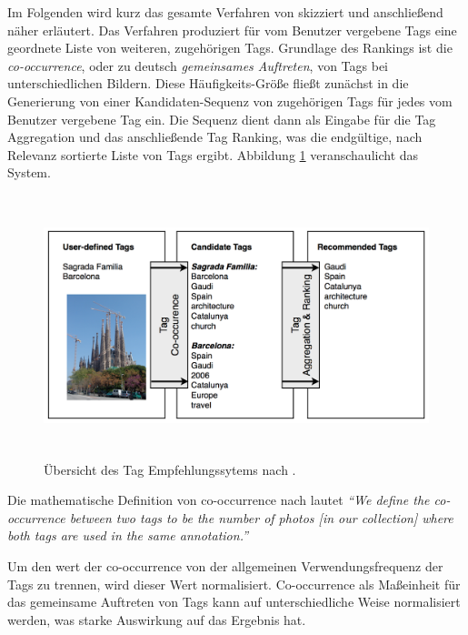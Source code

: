 Im Folgenden wird kurz das gesamte Verfahren von \cite{collectiveKnowledge} skizziert und anschließend näher erläutert. Das Verfahren produziert für vom Benutzer vergebene Tags eine geordnete Liste von weiteren, zugehörigen Tags. Grundlage des Rankings ist die \emph{co-occurrence}, oder zu deutsch \emph{gemeinsames Auftreten}, von Tags bei unterschiedlichen Bildern. Diese Häufigkeits-Größe fließt zunächst in die Generierung von einer Kandidaten-Sequenz von zugehörigen Tags für jedes vom Benutzer vergebene Tag ein. Die Sequenz dient dann als Eingabe für die Tag Aggregation und das anschließende Tag Ranking, was die endgültige, nach Relevanz sortierte Liste von Tags ergibt. Abbildung \ref{fig:images_collective_knowledge_system_overview} veranschaulicht das System.

\begin{figure}[htbp]
  \centering
    \includegraphics[height=3in]{images/collective_knowledge_system_overview.png}
  \caption{Übersicht des Tag Empfehlungssytems nach \cite{collectiveKnowledge}.}
  \label{fig:images_collective_knowledge_system_overview}
\end{figure}





Die mathematische Definition von co-occurrence nach \cite{collectiveKnowledge} lautet \emph{``We define the co-occurrence between two tags to be the number of photos [in our collection] where both tags are used in the same annotation.''}
 
 
Um den wert der co-occurrence von der allgemeinen Verwendungsfrequenz der Tags zu trennen, wird dieser Wert normalisiert. Co-occurrence als Maßeinheit für das gemeinsame Auftreten von Tags kann auf unterschiedliche Weise normalisiert werden, was starke Auswirkung auf das Ergebnis hat.

